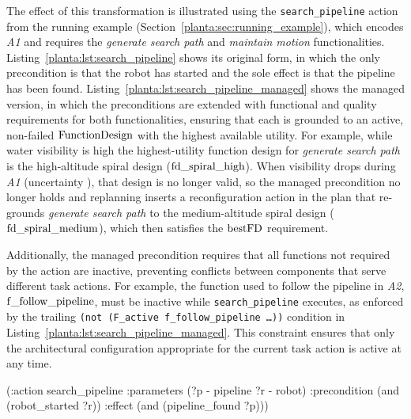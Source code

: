 The effect of this transformation is illustrated using the \texttt{search\_pipeline} action from the running example (Section~\ref{planta:sec:running_example}), which encodes \emph{A1} and requires the \emph{generate search path} and \emph{maintain motion} functionalities.
Listing~\ref{planta:lst:search_pipeline} shows its original form, in which the only precondition is that the robot has started and the sole effect is that the pipeline has been found.
Listing~\ref{planta:lst:search_pipeline_managed} shows the managed version, in which the preconditions are extended with functional and quality requirements for both functionalities, ensuring that each is grounded to an active, non-failed $\operatorname{FunctionDesign}$ with the highest available utility.  For example, while water visibility is high the highest-utility function design for \emph{generate search path} is the high-altitude spiral design ($\operatorname{fd\_spiral\_high}$). When visibility drops during \emph{A1} (uncertainty \Utwo), that design is no longer valid, so the managed precondition no longer holds and replanning inserts a reconfiguration action in the plan that re-grounds \emph{generate search path} to the medium-altitude spiral design ($\operatorname{fd\_spiral\_medium}$), which then satisfies the $\operatorname{bestFD}$ requirement.

Additionally, the managed precondition requires that all functions not required by the action are inactive, preventing conflicts between components that serve different task actions. For example, the function used to follow the pipeline in \emph{A2}, $\operatorname{f\_follow\_pipeline}$, must be inactive while \texttt{search\_pipeline} executes, as enforced by the trailing \texttt{(not (F\_active f\_follow\_pipeline \ldots{}))} condition in Listing~\ref{planta:lst:search_pipeline_managed}. This constraint ensures that only the architectural configuration appropriate for the current task action is active at any time. %

\begin{listing}[tbp]
\begin{Piton}[language=PDDL]
(:action search_pipeline
  :parameters (?p - pipeline ?r - robot)
  :precondition (and (robot_started ?r))
  :effect (and (pipeline_found ?p)))
\end{Piton}
\caption{Original \texttt{search\_pipeline} action}%
\label{planta:lst:search_pipeline}
\end{listing}

